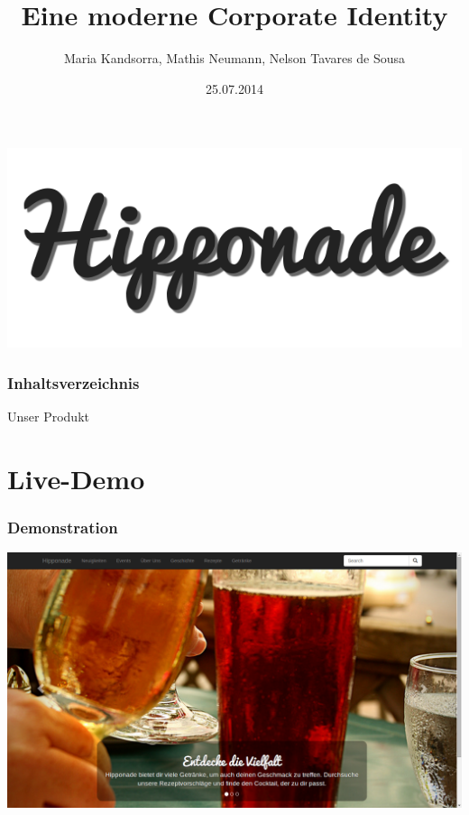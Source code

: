\documentclass{beamer}
\begin{document}
\title{Eine moderne Corporate Identity}  
\author{Maria Kandsorra, Mathis Neumann, Nelson Tavares de Sousa}
\date{25.07.2014} 

\begin{frame}
	\begin{center}
		\includegraphics[scale=0.5]{bilder/logo.png} 
	\end{center}
	\titlepage
\end{frame} 

\begin{frame}
	\frametitle{Inhaltsverzeichnis}
	\tableofcontents
\end{frame} 





\begin{frame}
	\begin{center}
		\huge{Unser Produkt}
	\end{center}
\end{frame}





\section{Live-Demo} 
\begin{frame}
	\frametitle{Demonstration} 
		\includegraphics[scale=0.227]{bilder/screenshot.png} 
\end{frame}

\end{document}
